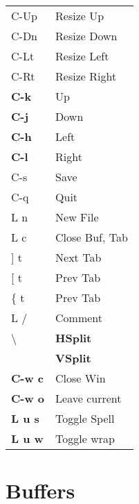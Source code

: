 \documentclass[
  ,landscape
  ,columns=4
]{cheatsheet}
\begin{document}
\begin{tabular}{l>{\color{black}}l}
	C-Up           & Resize Up       \\
	C-Dn           & Resize Down     \\
	C-Lt           & Resize Left     \\
	C-Rt           & Resize Right    \\
	\textbf{C-k}   & Up              \\
	\textbf{C-j}   & Down            \\
	\textbf{C-h}   & Left            \\
	\textbf{C-l}   & Right           \\
	C-s            & Save            \\
	C-q            & Quit            \\
	L n            & New File        \\
	L c            & Close Buf, Tab  \\
	{]} t          & Next Tab        \\
	{[} t          & Prev Tab        \\
	\{ t           & Prev Tab        \\
	L /            & Comment         \\
	\textbackslash & \textbf{HSplit} \\
	\textbar       & \textbf{VSplit} \\
	\textbf{C-w c} & Close Win       \\
	\textbf{C-w o} & Leave current   \\
	\textbf{L u s} & Toggle Spell    \\
	\textbf{L u w} & Toggle wrap     \\
\end{tabular}

\section{Buffers}
\end{document}
